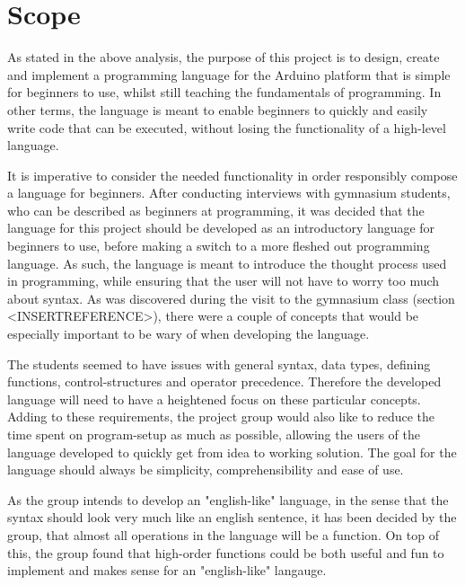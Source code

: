 \section{Scope}
As stated in the above analysis, the purpose of this project is to design, create and implement a
programming language for the Arduino platform that is simple for beginners to use, whilst still teaching the
fundamentals of programming.
In other terms, the language is meant to enable beginners to quickly and easily write
code that can be executed, without losing the functionality of a high-level language.

It is imperative to consider the needed functionality in order responsibly compose a language for
beginners.
After conducting interviews with gymnasium students, who can be described as beginners at programming,
it was decided that the language for this project should be developed as an introductory language for beginners to use, before making a switch to a more fleshed out programming language.
As such, the language is meant to introduce the thought process used in programming, while ensuring that the user will not have to worry too much about syntax.
As was discovered during the visit to the gymnasium class (section <INSERTREFERENCE>), there were a couple of concepts that would be especially important to be wary of when developing the language.

The students seemed to have issues with general syntax, data types, defining functions, control-structures and operator precedence.
Therefore the developed language will need to have a heightened focus on these particular concepts. 
Adding to these requirements, the project group would also like to reduce the time spent on program-setup as much as possible, allowing the users of the language developed to quickly get from idea to working solution.
The goal for the language should always be simplicity, comprehensibility and ease of use.

As the group intends to develop an "english-like" language, in the sense that the syntax should look very much like an english sentence, it has been decided by the group, that almost all operations in the language will be a function. 
On top of this, the group found that high-order functions could be both useful and fun to implement and makes sense for an "english-like" langauge. 


